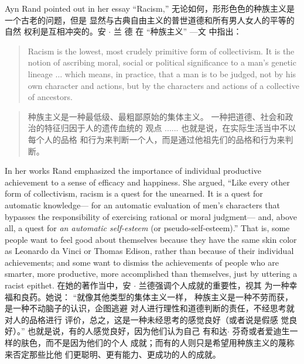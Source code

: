 \begin{paracol}{2}
Ayn Rand pointed out in her essay ``Racism,''
\switchcolumn
无论如何，形形色色的种族主义是一个古老的问题，但是
显然与古典自由主义的普世道德和所有男人女人的平等的自然
权利是互相冲突的。安 $\cdot$ 兰 德 在 “种族主义” ---文
中指出：
\switchcolumn*
\begin{quote}
Racism is the lowest, most crudely primitive form of collectivism.
It is the notion of ascribing moral, social or political significance
to a man's genetic lineage $\ldots$ which means, in practice, that a
man is to be judged, not by his own character and actions, but by
the characters and actions of a collective of ancestors.
\end{quote}
\switchcolumn
\begin{quote}
	种族主义是一种最低级、最粗鄙原始的集体主义。
	一种把道德、社会和政治的特征归因于人的遗传血统的
	观点 ...... 也就是说，在实际生活当中不以每个人的品格
	和行为来判断一个人，而是通过他祖先们的品格和行为来判断。
\end{quote}
\switchcolumn*
In her works Rand emphasized the importance of individual
productive achievement to a sense of efficacy and happiness.
She argued, ``Like every other form of collectivism, racism is a
quest for the unearned. It is a quest for automatic knowledge---
for an automatic evaluation of men's characters that bypasses
the responsibility of exercising rational or moral judgment---
and, above all, a quest for \textit{an automatic self-esteem} (or pseudo-self-esteem).'' That is, some people want to feel good about themselves because they have the same skin color as Leonardo
da Vinci or Thomas Edison, rather than because of their individual achievements; and some want to dismiss the achievements of people who are smarter, more productive, more
accomplished than themselves, just by uttering a racist epithet.
\switchcolumn
在她的著作当中，安 $\cdot$ 兰德强调个人成就的重要性，视其
为一种幸福和良药。她说： “就像其他类型的集体主义一样，
种族主义是一种不劳而获，是一种不动脑子的认识，企图逃避
对人进行理性和道德判断的责任，不经思考就对人的品格进行
评价，总之，这是一种未经思考的感觉良好（或者说是假感
觉良好）。” 也就是说，有的人感觉良好，因为他们认为自己
有和达$\cdot$ 芬奇或者爱迪生一样的肤色，而不是因为他们的个人
成就；而有的人则只是希望用种族主义的蔑称来否定那些比他
们更聪明、更有能力、更成功的人的成就。


\end{paracol}
